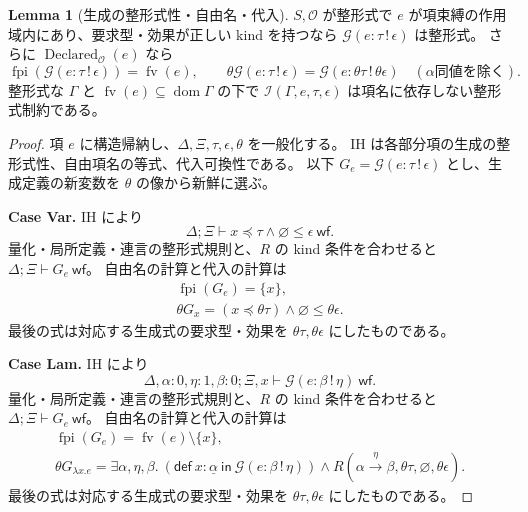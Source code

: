 \documentclass[a4paper,11pt]{article}
\theoremstyle{definition}
\newtheorem{lemma}[definition]{Lemma}
\newenvironment{Case}[1]{\par\smallskip\noindent\textbf{Case #1.}\enspace\ignorespaces}{\par}
\newcommand{\FV}{\operatorname{fv}}
\newcommand{\FPI}{\operatorname{fpi}}
\newcommand{\dom}{\operatorname{dom}}
\newcommand{\ops}{\mathcal O}
\newcommand{\emp}{\varnothing}
\newcommand{\arr}[3]{#1\xrightarrow{#2}#3}
\newcommand{\gen}[3]{\mathcal G(#1:#2\,!\,#3)}
\newcommand{\infers}[4]{\mathcal I(#1,#2,#3,#4)}
\newcommand{\inst}[2]{#1\preccurlyeq #2}
\newcommand{\Def}[3]{\mathsf{def}\ #1:#2\ \mathsf{in}\ #3}
\newcommand{\mono}[1]{\underline{#1}}
\newcommand{\proofspace}{\Needspace{16\baselineskip}}
\begin{document}
\proofspace
\begin{samepage}
\begin{lemma}[生成の整形式性・自由名・代入]\label{lem:gen-wf}
$S,\ops$ が整形式で $e$ が項束縛の作用域内にあり、要求型・効果が正しい kind を持つなら
$\gen e\tau\epsilon$ は整形式。
さらに $\operatorname{Declared}_\ops(e)$ なら
\[
 \FPI(\gen e\tau\epsilon)=\FV(e),\qquad
 \theta\gen e\tau\epsilon=\gen e{\theta\tau}{\theta\epsilon}
 \quad(\alpha\text{同値を除く}).
\]
整形式な $\Gamma$ と $\FV(e)\subseteq\dom\Gamma$ の下で
$\infers\Gamma e\tau\epsilon$ は項名に依存しない整形式制約である。
\end{lemma}
\end{samepage}
\nopagebreak[4]
\begin{proof}\leavevmode\label{proof:lem:gen-wf}
項 $e$ に構造帰納し、$\Delta,\Xi,\tau,\epsilon,\theta$ を一般化する。
IH は各部分項の生成の整形式性、自由項名の等式、代入可換性である。
以下 $G_e=\gen e\tau\epsilon$ とし、生成定義の新変数を $\theta$ の像から新鮮に選ぶ。

\begin{Case}{Var}
IH により
\[\Delta;\Xi\vdash\inst x\tau\land\emp\leq\epsilon\ \mathsf{wf}.\]
量化・局所定義・連言の整形式規則と、$R$ の kind 条件を合わせると $\Delta;\Xi\vdash G_e\ \mathsf{wf}$。
自由名の計算と代入の計算は
\begin{gather*}
 \FPI(G_e)=\{x\},\\
 \theta G_x=(\inst x{\theta\tau})\land\emp\leq\theta\epsilon.
\end{gather*}
最後の式は対応する生成式の要求型・効果を $\theta\tau,\theta\epsilon$ にしたものである。
\end{Case}

\begin{Case}{Lam}
IH により
\[\Delta,\alpha:0,\eta:1,\beta:0;\Xi,x\vdash\gen e\beta\eta\ \mathsf{wf}.\]
量化・局所定義・連言の整形式規則と、$R$ の kind 条件を合わせると $\Delta;\Xi\vdash G_e\ \mathsf{wf}$。
自由名の計算と代入の計算は
\begin{gather*}
 \FPI(G_e)=\FV(e)\setminus\{x\},\\
 \theta G_{\lambda x.e}=\exists\alpha,\eta,\beta.\ (\Def x{\mono\alpha}{\gen e\beta\eta})\land R(\arr\alpha\eta\beta,\theta\tau,\emp,\theta\epsilon).
\end{gather*}
最後の式は対応する生成式の要求型・効果を $\theta\tau,\theta\epsilon$ にしたものである。
\end{Case}


\end{proof}
\end{document}

